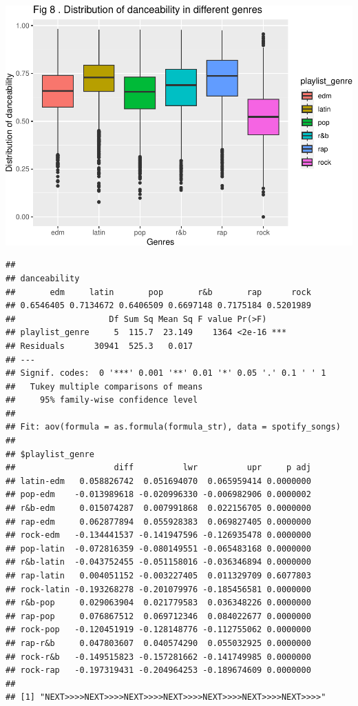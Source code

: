 \documentclass[
]{article}
\begin{document}
\includegraphics{Final-Report_files/figure-latex/unnamed-chunk-14-4.pdf}

\begin{verbatim}
## 
## danceability
##       edm     latin       pop       r&b       rap      rock 
## 0.6546405 0.7134672 0.6406509 0.6697148 0.7175184 0.5201989 
##                   Df Sum Sq Mean Sq F value Pr(>F)    
## playlist_genre     5  115.7  23.149    1364 <2e-16 ***
## Residuals      30941  525.3   0.017                   
## ---
## Signif. codes:  0 '***' 0.001 '**' 0.01 '*' 0.05 '.' 0.1 ' ' 1
##   Tukey multiple comparisons of means
##     95% family-wise confidence level
## 
## Fit: aov(formula = as.formula(formula_str), data = spotify_songs)
## 
## $playlist_genre
##                    diff          lwr          upr     p adj
## latin-edm   0.058826742  0.051694070  0.065959414 0.0000000
## pop-edm    -0.013989618 -0.020996330 -0.006982906 0.0000002
## r&b-edm     0.015074287  0.007991868  0.022156705 0.0000000
## rap-edm     0.062877894  0.055928383  0.069827405 0.0000000
## rock-edm   -0.134441537 -0.141947596 -0.126935478 0.0000000
## pop-latin  -0.072816359 -0.080149551 -0.065483168 0.0000000
## r&b-latin  -0.043752455 -0.051158016 -0.036346894 0.0000000
## rap-latin   0.004051152 -0.003227405  0.011329709 0.6077803
## rock-latin -0.193268278 -0.201079976 -0.185456581 0.0000000
## r&b-pop     0.029063904  0.021779583  0.036348226 0.0000000
## rap-pop     0.076867512  0.069712346  0.084022677 0.0000000
## rock-pop   -0.120451919 -0.128148776 -0.112755062 0.0000000
## rap-r&b     0.047803607  0.040574290  0.055032925 0.0000000
## rock-r&b   -0.149515823 -0.157281662 -0.141749985 0.0000000
## rock-rap   -0.197319431 -0.204964253 -0.189674609 0.0000000
## 
## [1] "NEXT>>>>NEXT>>>>NEXT>>>>NEXT>>>>NEXT>>>>NEXT>>>>NEXT>>>>"
\end{verbatim}
\end{document}
